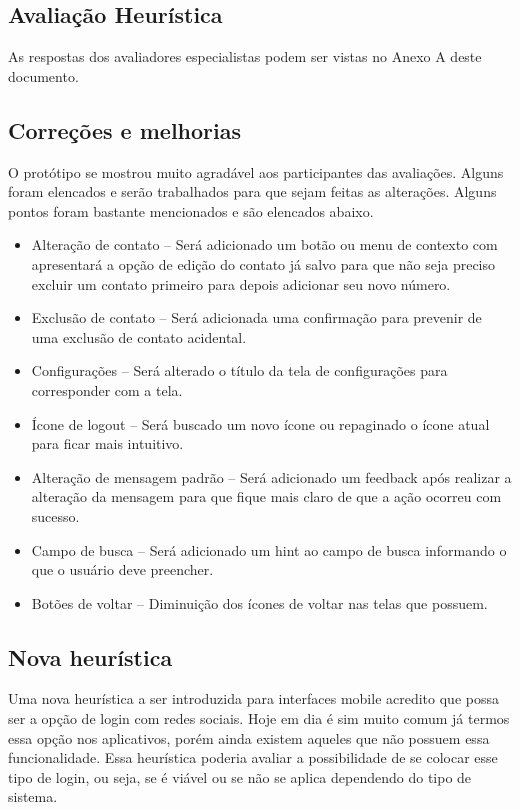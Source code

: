 \subsection{Avaliação Heurística}
As respostas dos avaliadores especialistas podem ser vistas no Anexo A deste documento.

\subsection{Correções e melhorias}
O protótipo se mostrou muito agradável aos participantes das avaliações. Alguns foram elencados e serão trabalhados para que sejam feitas as alterações. Alguns pontos foram bastante mencionados e são elencados abaixo.
\begin{itemize}
\item Alteração de contato – Será adicionado um botão ou menu de contexto com apresentará a opção de edição do contato já salvo para que não seja preciso excluir um contato primeiro para depois adicionar seu novo número.
\item Exclusão de contato – Será adicionada uma confirmação para prevenir de uma exclusão de contato acidental.
\item Configurações – Será alterado o título da tela de configurações para corresponder com a tela.
\item Ícone de logout – Será buscado um novo ícone ou repaginado o ícone atual para ficar mais intuitivo. 
\item Alteração de mensagem padrão – Será adicionado um feedback após realizar a alteração da mensagem para que fique mais claro de que a ação ocorreu com sucesso.
\item Campo de busca – Será adicionado um hint ao campo de busca informando o que o usuário deve preencher.
\item Botões de voltar – Diminuição dos ícones de voltar nas telas que possuem.
\end{itemize}
 
\subsection{Nova heurística}
Uma nova heurística a ser introduzida para interfaces mobile acredito que possa ser a opção de login com redes sociais. Hoje em dia é sim muito comum já termos essa opção nos aplicativos, porém ainda existem aqueles que não possuem essa funcionalidade. Essa heurística poderia avaliar a possibilidade de se colocar esse tipo de login, ou seja, se é viável ou se não se aplica dependendo do tipo de sistema.

